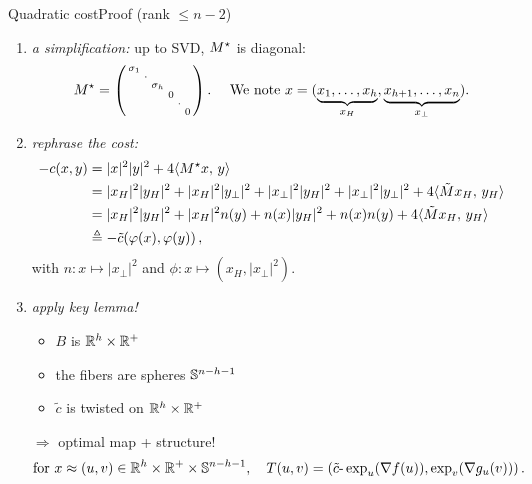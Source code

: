 \documentclass[9pt,xcolor={dvipsnames}]{beamer}
\begin{document}
\begin{frame}{Quadratic cost}{Proof (rank $\leq n-2$)}
    \begin{center}
        \begin{enumerate}
            \item \emph{a simplification:} up to SVD, $M^\star$ is diagonal:
                $$M^\star=\left(\begin{smallmatrix}
                    \sigma_1 & & & & &\\
                    & \cdot & & & &\\
                    &  & \sigma_h & & &\\
                    &  &  & 0 & &\\
                    &  &  & & \cdot & \\
                    &  &  & &  & 0 \\
                \end{smallmatrix}\right).\quad\text{ We note } x=(\underbrace{x_1,\dots,x_h}_{x_H},\underbrace{x_{h+1},\dots,x_n}_{x_\perp}).$$
            \item \emph{rephrase the cost:}
                \begin{align*}
                    -c(x,y) & =|x|^{2}|y|^{2}+4\langle M^\star x,\,y\rangle \\
                    & =|x_{H}|^{2}|y_{H}|^{2}+|x_{H}|^{2}|y_{\perp}|^{2}+|x_{\perp}|^{2}|y_{H}|^{2}+|x_{\perp}|^{2}|y_{\perp}|^{2}+4\langle \tilde Mx_{H},\, y_{H}\rangle\\
                    & =|x_{H}|^{2}|y_{H}|^{2}+|x_{H}|^{2}n(y)+n(x)|y_{H}|^{2}+n(x)n(y)+4\langle \tilde Mx_{H},\, y_{H}\rangle\\
                    & \triangleq -\tilde c(\varphi(x),\varphi(y))\,,
                \end{align*}
                with $n: x\mapsto |x_{\perp}|^2$ and $\phi: x\mapsto (x_{H},|x_{\perp}|^2)$.
            \item \emph{apply key lemma!} \begin{itemize}
                \item $B$ is $\mathbb{R}^h\times\mathbb{R}^+$
                \item the fibers are spheres $\mathbb{S}^{n-h-1}$
                \item $\tilde c$ is {twisted} on $\mathbb{R}^h\times\mathbb{R}^+$
            \end{itemize}
            \vfill
        \item[$\Rightarrow$] optimal map + structure!
        $$\text{for } x\approx (u,v) \in \mathbb{R}^h\times\mathbb{R}^+\times\mathbb{S}^{n-h-1},\quad T(u,v)=\left(\tilde c\text{-}\exp_{u}(\nabla f(u)), \exp_{v}(\nabla g_{u}(v))\right).$$
        \hfill\square
        \end{enumerate}
    \end{center}
\end{frame}
\end{document}
